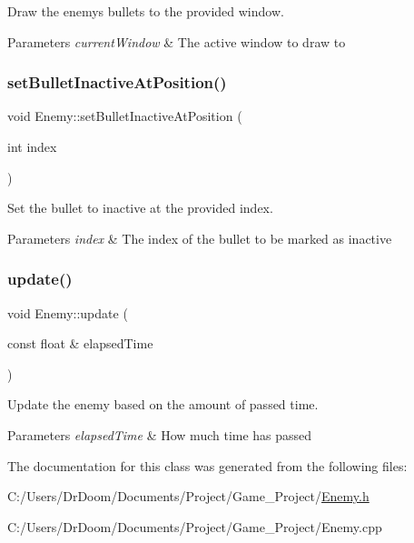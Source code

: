Draw the enemy\textquotesingle{}s bullets to the provided window. 


\begin{DoxyParams}{Parameters}
{\em current\+Window} & The active window to draw to \\
\hline
\end{DoxyParams}
\mbox{\label{class_enemy_a02e1cacf8fad39bbcc28271a53637024}} 
\subsubsection{\texorpdfstring{set\+Bullet\+Inactive\+At\+Position()}{setBulletInactiveAtPosition()}}
{\footnotesize\ttfamily void Enemy\+::set\+Bullet\+Inactive\+At\+Position (\begin{DoxyParamCaption}\item[{int}]{index }\end{DoxyParamCaption})}



Set the bullet to inactive at the provided index. 


\begin{DoxyParams}{Parameters}
{\em index} & The index of the bullet to be marked as inactive \\
\hline
\end{DoxyParams}
\mbox{\label{class_enemy_a541b72a32e4a0217d58d1ee573c2f23a}} 
\subsubsection{\texorpdfstring{update()}{update()}}
{\footnotesize\ttfamily void Enemy\+::update (\begin{DoxyParamCaption}\item[{const float \&}]{elapsed\+Time }\end{DoxyParamCaption})}



Update the enemy based on the amount of passed time. 


\begin{DoxyParams}{Parameters}
{\em elapsed\+Time} & How much time has passed \\
\hline
\end{DoxyParams}


The documentation for this class was generated from the following files\+:\begin{DoxyCompactItemize}
\item 
C\+:/\+Users/\+Dr\+Doom/\+Documents/\+Project/\+Game\+\_\+\+Project/\hyperlink{_enemy_8h}{Enemy.\+h}\item 
C\+:/\+Users/\+Dr\+Doom/\+Documents/\+Project/\+Game\+\_\+\+Project/Enemy.\+cpp\end{DoxyCompactItemize}
